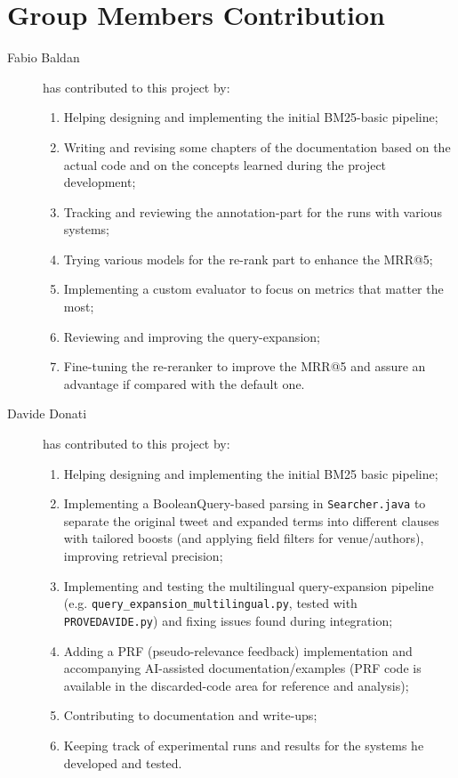 \section{Group Members Contribution}


\begin{description}
	\item[Fabio Baldan] has contributed to this project by:
    \begin{enumerate}
        \item Helping designing and implementing the initial BM25-basic pipeline;
        \item Writing and revising some chapters of the documentation based on the actual code and on the concepts learned during the project development;
        \item Tracking and reviewing the annotation-part for the runs with various systems;
        \item Trying various models for the re-rank part to enhance the MRR@5;
        \item Implementing a custom evaluator to focus on metrics that matter the most;
        \item Reviewing and improving the query-expansion;
        \item Fine-tuning the re-reranker to improve the MRR@5 and assure an advantage if compared with the default one.
    \end{enumerate}

    \item[Davide Donati] has contributed to this project by:
    \begin{enumerate}
        \item Helping designing and implementing the initial BM25 basic pipeline;
        \item Implementing a BooleanQuery-based parsing in \texttt{Searcher.java} to separate the original tweet and expanded terms into different clauses with tailored boosts (and applying field filters for venue/authors), improving retrieval precision;
        \item Implementing and testing the multilingual query-expansion pipeline (e.g. \texttt{query\_expansion\_multilingual.py}, tested with \texttt{PROVEDAVIDE.py}) and fixing issues found during integration;
        \item Adding a PRF (pseudo-relevance feedback) implementation and accompanying AI-assisted documentation/examples (PRF code is available in the discarded-code area for reference and analysis);
        \item Contributing to documentation and write-ups;
        \item Keeping track of experimental runs and results for the systems he developed and tested.
    \end{enumerate}


\end{description}
